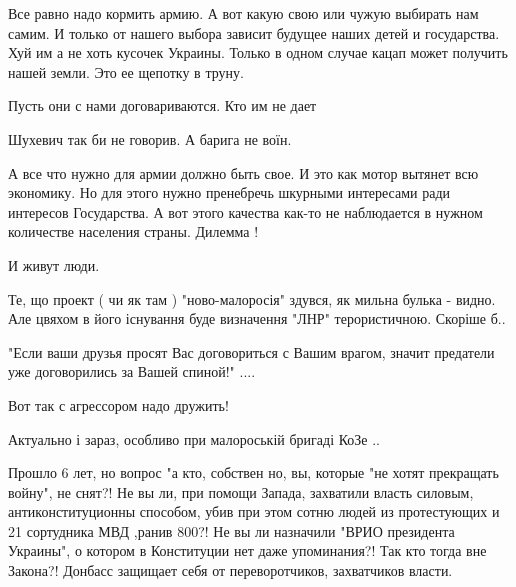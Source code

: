 \begin{itemize}
Все равно надо кормить армию. А вот какую свою или чужую выбирать нам самим. И
только от нашего выбора зависит будущее наших детей и государства. Хуй им а не
хоть кусочек Украины. Только в одном случае кацап может получить нашей земли.
Это ее щепотку в труну.


Пусть они с нами договариваются. Кто им не дает

Шухевич так би не говорив. А барига не воїн.


А все что нужно для армии должно быть свое. И это как мотор вытянет всю
экономику. Но для этого нужно пренебречь шкурными интересами ради интересов
Государства. А вот этого качества как-то не наблюдается в нужном количестве
населения страны. Дилемма !


И живут люди.


Те, що проект ( чи як там ) "ново-малоросія" здувся, як мильна булька -
видно. Але цвяхом в його існування буде визначення "ЛНР" терористичною. Скоріше
б..


"Если ваши друзья просят Вас договориться с Вашим врагом, значит предатели уже
договорились за Вашей спиной!" ....

Вот так с агрессором надо дружить!

Актуально і зараз, особливо при малороській бригаді КоЗе ..


Прошло 6 лет, но вопрос "а кто, собствен но, вы, которые "не хотят прекращать
войну", не снят?!  Не вы ли, при помощи Запада, захватили власть силовым,
антиконституционны способом, убив при этом сотню людей из протестующих и 21
сортудника МВД ,ранив 800?! Не вы ли назначили "ВРИО президента Украины", о
котором в Конституции нет даже упоминания?! Так кто тогда вне Закона?! Донбасс
защищает себя от переворотчиков, захватчиков власти.


\end{itemize} %
